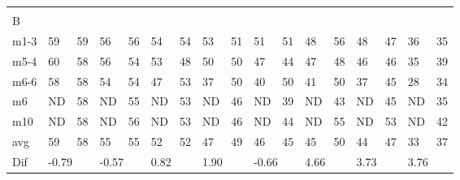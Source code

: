 \begin{table}[]
\begin{tabular}{l|l|l|l|l|l|l|l|l|l|l|l|l|l|l|ll}
\multicolumn{17}{l}{ } \\   
B & \multicolumn{2}{l|}{} & \multicolumn{2}{l|}{} & \multicolumn{2}{l|}{} & \multicolumn{2}{l|}{} & \multicolumn{2}{l|}{} & \multicolumn{2}{l|}{}& \multicolumn{2}{l|}{}& \multicolumn{2}{l}{}     \\ \hline
m1-3   &    59    &    59   &   56    &   56    &    54   &   54     &   53     &   51       &    51   &    51     &    48   &     56      &      48   &    47   & \multicolumn{1}{l|}{36} &35  \\
m5-4   &    60    &    58   &   56    &  54     &    53     &  48    &   50     &    50     &  47     &     44     &   47   &     48       &     46    &    46   & \multicolumn{1}{l|}{35} &39  \\
m6-6   &   58      &   58      &   54   &  54   &   47    &   53     &    37    &    50      &   40   &     50     &     41    &    50     &     37     &   45  & \multicolumn{1}{l|}{28} &34  \\
m6   &   ND     &      58   &    ND  &     55  &    ND    &   53   &   ND   &    46      &   ND  &      39    &   ND    &      43    &     ND   &     45  & \multicolumn{1}{l|}{ND} & 35 \\
m10  &   ND   &    58   &    ND   &     56    &    ND    &   53   &   ND   &    46      &   ND   &     44    &     ND  &     55     &     ND   &     53  & \multicolumn{1}{l|}{ND} &42  \\ \hline
avg  &     59    &     58    &    55     &     55       &     52    &   52         &     47   &   49         &     46     &  45         &     45       &    50        &       44        &   47       & \multicolumn{1}{l|}{33} & 37\\ \hline
Dif & \multicolumn{2}{l|}{-0.79} & \multicolumn{2}{l|}{-0.57} & \multicolumn{2}{l|}{0.82} & \multicolumn{2}{l|}{1.90} & \multicolumn{2}{l|}{-0.66} & \multicolumn{2}{l|}{4.66}& \multicolumn{2}{l|}{3.73}& \multicolumn{2}{l}{3.76}     
\end{tabular}
\end{table}


